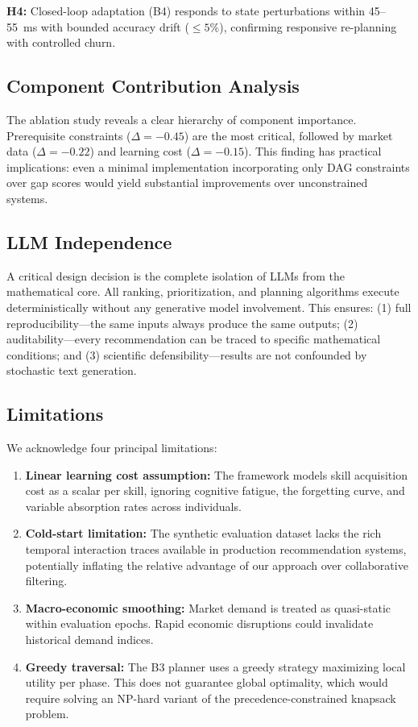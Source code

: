 \documentclass[conference]{IEEEtran}
\begin{document}
\textbf{H4:} Closed-loop adaptation (B4) responds to state perturbations within 45--55~ms with bounded accuracy drift ($\leq 5\%$), confirming responsive re-planning with controlled churn.

\subsection{Component Contribution Analysis}

The ablation study reveals a clear hierarchy of component importance. Prerequisite constraints ($\Delta{=}{-}0.45$) are the most critical, followed by market data ($\Delta{=}{-}0.22$) and learning cost ($\Delta{=}{-}0.15$). This finding has practical implications: even a minimal implementation incorporating only DAG constraints over gap scores would yield substantial improvements over unconstrained systems.

\subsection{LLM Independence}

A critical design decision is the complete isolation of LLMs from the mathematical core. All ranking, prioritization, and planning algorithms execute deterministically without any generative model involvement. This ensures: (1) full reproducibility---the same inputs always produce the same outputs; (2) auditability---every recommendation can be traced to specific mathematical conditions; and (3) scientific defensibility---results are not confounded by stochastic text generation.

\subsection{Limitations}

We acknowledge four principal limitations:

\begin{enumerate}
    \item \textbf{Linear learning cost assumption:} The framework models skill acquisition cost as a scalar per skill, ignoring cognitive fatigue, the forgetting curve, and variable absorption rates across individuals.
    \item \textbf{Cold-start limitation:} The synthetic evaluation dataset lacks the rich temporal interaction traces available in production recommendation systems, potentially inflating the relative advantage of our approach over collaborative filtering.
    \item \textbf{Macro-economic smoothing:} Market demand is treated as quasi-static within evaluation epochs. Rapid economic disruptions could invalidate historical demand indices.
    \item \textbf{Greedy traversal:} The B3 planner uses a greedy strategy maximizing local utility per phase. This does not guarantee global optimality, which would require solving an NP-hard variant of the precedence-constrained knapsack problem.
\end{enumerate}
\end{document}
